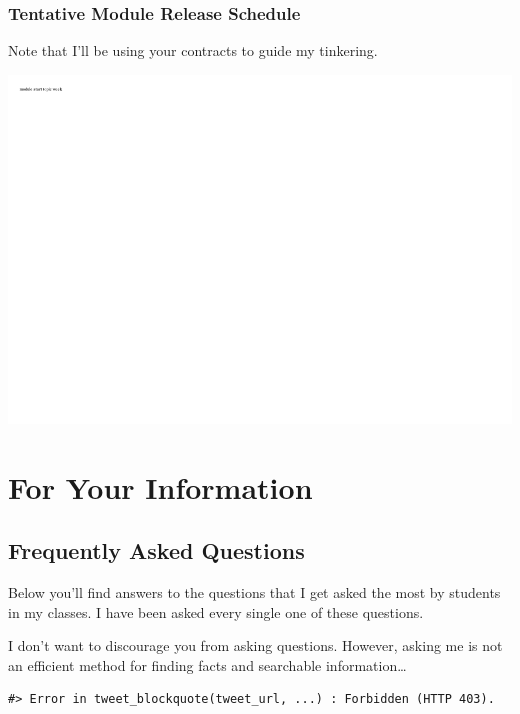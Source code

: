 \hypertarget{tentative-module-release-schedule}{%
\section*{Tentative Module Release Schedule}\label{tentative-module-release-schedule}}


Note that I'll be using your contracts to guide my tinkering.

\includegraphics{0204_datascience_files/figure-latex/unnamed-chunk-3-1.pdf}

\hypertarget{part-for-your-information}{%
\part*{For Your Information}\label{part-for-your-information}}


\hypertarget{frequently-asked-questions}{%
\chapter{Frequently Asked Questions}\label{frequently-asked-questions}}

Below you'll find answers to the questions that I get asked the most by students in my classes. I have been asked every single one of these questions.

I don't want to discourage you from asking questions. However, asking me is not an efficient method for finding facts and searchable information\ldots{}

\begin{verbatim}
#> Error in tweet_blockquote(tweet_url, ...) : Forbidden (HTTP 403).
\end{verbatim}

